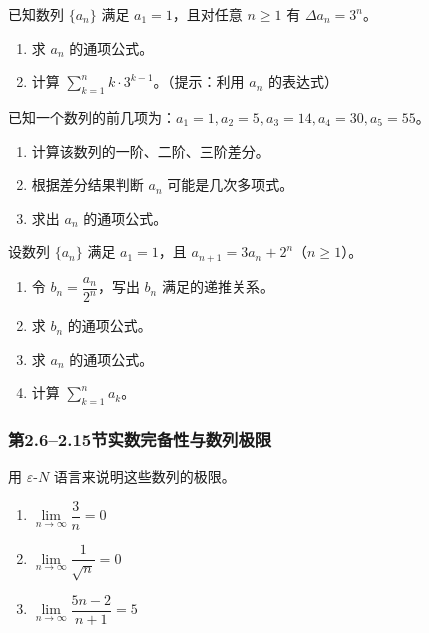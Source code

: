 \documentclass[fontset=fandol]{ctexart}
\begin{document}
\begin{exercise}已知数列 \(\{a_n\}\) 满足 \(a_1 = 1\)，且对任意 \(n \geq 1\) 有 \(\Delta a_n = 3^n\)。
\begin{enumerate}
\item 求 \(a_n\) 的通项公式。
\item 计算 \(\sum_{k=1}^{n} k \cdot 3^{k-1}\)。（提示：利用 \(a_n\) 的表达式）
\end{enumerate}
\end{exercise}

\begin{exercise}已知一个数列的前几项为：\(a_1 = 1, a_2 = 5, a_3 = 14, a_4 = 30, a_5 = 55\)。
\begin{enumerate}
\item 计算该数列的一阶、二阶、三阶差分。
\item 根据差分结果判断 \(a_n\) 可能是几次多项式。
\item 求出 \(a_n\) 的通项公式。
\end{enumerate}
\end{exercise}

\begin{exercise}[较难：递推与差分的综合应用]
设数列 \(\{a_n\}\) 满足 \(a_1 = 1\)，且 \(a_{n+1} = 3a_n + 2^n\)（\(n \geq 1\)）。
\begin{enumerate}
\item 令 \(b_n = \dfrac{a_n}{2^n}\)，写出 \(b_n\) 满足的递推关系。
\item 求 \(b_n\) 的通项公式。
\item 求 \(a_n\) 的通项公式。
\item 计算 \(\sum_{k=1}^{n} a_k\)。
\end{enumerate}
\end{exercise}

\subsubsection*{第2.6--2.15节\quad 实数完备性与数列极限}


\begin{exercise}
用 \(\varepsilon\)-\(N\) 语言来说明这些数列的极限。
\begin{enumerate}
\item \(\lim\limits_{n\to\infty} \dfrac{3}{n} = 0\)
\item \(\lim\limits_{n\to\infty} \dfrac{1}{\sqrt{n}} = 0\)
\item \(\lim\limits_{n\to\infty} \dfrac{5n-2}{n+1} = 5\)
\end{enumerate}
\end{exercise}
\end{document}
